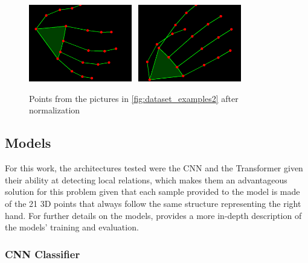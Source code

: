 \begin{figure}[ht]
    \centerline{\includegraphics[width=0.4\textwidth]{figs/dataset_preprocessing3_1.png} \ \includegraphics[width=0.4\textwidth]{figs/dataset_preprocessing3_2.png}}
    \caption{Points from the pictures in \autoref{fig:dataset_examples2} after normalization}
    \label{fig:dataset_examples3}
\end{figure}

\subsection{Models}

For this work, the architectures tested were the CNN and the Transformer given their ability at detecting local relations, which makes them an advantageous solution for this problem given that each sample provided to the model is made of the 21 3D points that always follow the same structure representing the right hand. For further details on the models, \textcite{Amaral2023} provides a more in-depth description of the models' training and evaluation.

\subsubsection{CNN Classifier}
\label{subsubsection:cnn_classifier}

